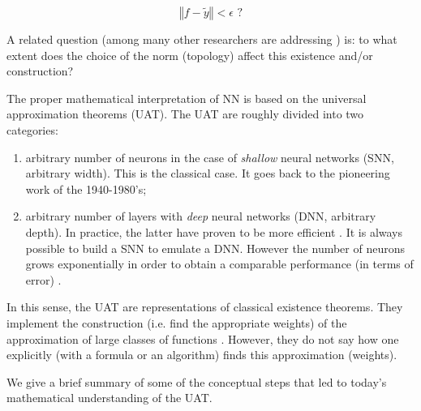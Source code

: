 \documentclass{article}
\begin{document}
\[
\left\Vert f-\widetilde{y}\right\Vert <\epsilon\text{ ?}%
\]

A related question (among many other researchers are addressing \citep{fan2020universal}) is: to what extent does the choice of the norm (topology) affect this existence and/or construction?

The proper mathematical interpretation of NN is based on the universal
approximation theorems (UAT). The UAT are roughly divided into two categories:

\begin{enumerate}
\item arbitrary number of neurons in the case of {\it shallow} neural networks (SNN, arbitrary width). This is the classical case. It goes back to the pioneering work of the 1940-1980's;

\item arbitrary number of layers with {\it deep} neural networks (DNN, arbitrary
depth). In practice, the latter have proven to be more efficient
\citep{mhaskar2019function}. It is always possible to build a SNN to emulate a DNN. However the number of neurons grows exponentially in order to obtain a
comparable performance (in terms of error) \citep{telgarsky2016benefits,eldan2016power}.
\end{enumerate}

In this sense, the UAT are representations of classical existence theorems. They implement the construction (i.e. find the appropriate weights) of the approximation of large classes of functions \citep{paluzo2020two}. However, they do not say how one explicitly (with a formula or an algorithm) finds this approximation (weights).

We give a brief summary of some of the conceptual steps that led to today's mathematical understanding of the UAT.
\end{document}
